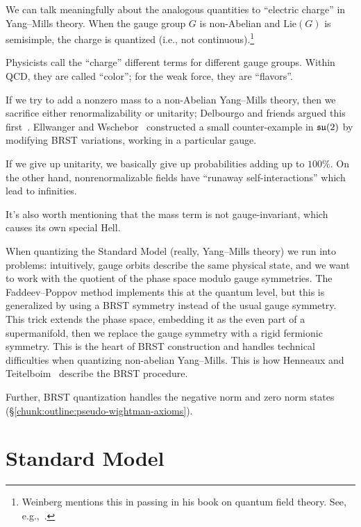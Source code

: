 We can talk meaningfully about the analogous quantities to ``electric
charge'' in Yang--Mills theory. When the gauge group $G$ is non-Abelian
and $\mathrm{Lie}(G)$ is semisimple,
the charge is quantized (i.e., not continuous).\footnote{Weinberg
mentions this in passing in his book on quantum field theory. See, e.g.,~\cite[esp.~\S3.3,\S23.3]{Weinberg:1995mt}.}

Physicists call the ``charge'' different terms for different gauge
groups. Within QCD, they are called ``color''; for the weak force, they
are ``flavors''.

If we try to add a nonzero mass to a non-Abelian Yang--Mills theory,
then we sacrifice either renormalizability or unitarity; Delbourgo and
friends argued this first~\cite{Delbourgo:1987np}.
Ellwanger and Wschebor~\cite{Ellwanger:2002sj} constructed a small
counter-example in $\mathfrak{su}(2)$ by modifying BRST variations, working in a
particular gauge.

If we give up unitarity, we basically give up probabilities adding up to
$100\%$. On the other hand, nonrenormalizable fields have ``runaway
self-interactions'' which lead to infinities.

It's also worth mentioning that the mass term is not gauge-invariant,
which causes its own special Hell.

When quantizing the Standard Model (really, Yang--Mills theory) we run
into problems: intuitively, gauge orbits describe the same physical
state, and we want to work with the quotient of the phase space modulo
gauge symmetries. The Faddeev--Poppov method implements this at the
quantum level, but this is generalized by using a BRST symmetry instead
of the usual gauge symmetry. This trick extends the phase space, embedding it as
the even part of a supermanifold, then we replace the gauge symmetry
with a rigid fermionic symmetry. This is the heart of BRST construction
and handles technical difficulties when quantizing non-abelian Yang--Mills.
This is how Henneaux and Teitelboim~\cite[\S8.1]{Henneaux:1992ig}
describe the BRST procedure.

Further, BRST quantization handles the negative norm and zero norm
states (\S\ref{chunk:outline:pseudo-wightman-axioms}).

\section{Standard Model}


